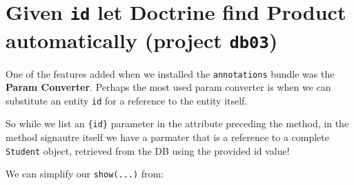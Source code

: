 \documentclass[a4paperpaper,openright]{book}
\newenvironment{Shaded}{}{}
\newcommand{\CommentTok}[1]{\textcolor[rgb]{0.38,0.63,0.69}{\textit{#1}}}
\newcommand{\KeywordTok}[1]{\textcolor[rgb]{0.00,0.44,0.13}{\textbf{#1}}}
\newcommand{\NormalTok}[1]{#1}
\newcommand{\OtherTok}[1]{\textcolor[rgb]{0.00,0.44,0.13}{#1}}
\newcommand{\StringTok}[1]{\textcolor[rgb]{0.25,0.44,0.63}{#1}}
\begin{document}
\hypertarget{given-id-let-doctrine-find-product-automatically-project-db03}{%
\section{\texorpdfstring{Given \texttt{id} let Doctrine find Product
automatically (project
\texttt{db03})}{Given id let Doctrine find Product automatically (project db03)}}\label{given-id-let-doctrine-find-product-automatically-project-db03}}

One of the features added when we installed the \texttt{annotations}
bundle was the \textbf{Param Converter}. Perhaps the most used param
converter is when we can substitute an entity \texttt{id} for a
reference to the entity itself.

So while we list an \texttt{\{id\}} parameter in the attribute preceding
the method, in the method signautre itself we have a parmater that is a
reference to a complete \texttt{Student} object, retrieved from the DB
using the provided id value!

We can simplify our \texttt{show(...)} from:

\begin{Shaded}
\end{Shaded}
\end{document}

